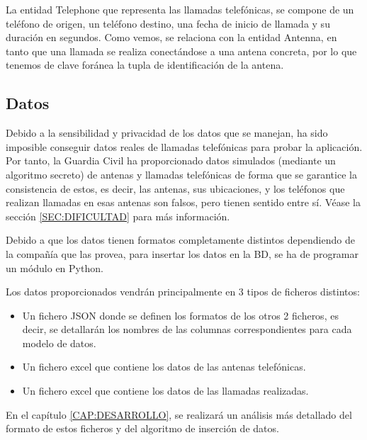     La entidad Telephone que representa las llamadas telefónicas, se compone de un teléfono de origen, un teléfono destino, una fecha de inicio de llamada y su duración en segundos. Como vemos, se relaciona con la entidad Antenna, en tanto que una llamada se realiza conectándose a una antena concreta, por lo que tenemos de clave foránea la tupla de identificación de la antena.
       
       
  \subsection{Datos}
    Debido a la sensibilidad y privacidad de los datos que se manejan, ha sido imposible conseguir datos reales de llamadas telefónicas para probar la aplicación. Por tanto, la Guardia Civil ha proporcionado datos simulados (mediante un algoritmo secreto) de antenas y llamadas telefónicas de forma que se garantice la consistencia de estos, es decir, las antenas, sus ubicaciones, y los teléfonos que realizan llamadas en esas antenas son falsos, pero tienen sentido entre sí. Véase la sección \ref{SEC:DIFICULTAD} para más información.

    Debido a que los datos tienen formatos completamente distintos dependiendo de la compañía que las provea, para insertar los datos en la BD, se ha de programar un módulo en Python.
    
    Los datos proporcionados vendrán principalmente en 3 tipos de ficheros distintos:
    \begin{itemize}
      \item Un fichero JSON donde se definen los formatos de los otros 2 ficheros, es decir, se detallarán los nombres de las columnas correspondientes para cada modelo de datos.
      \item Un fichero excel que contiene los datos de las antenas telefónicas.
      \item Un fichero excel que contiene los datos de las llamadas realizadas.
    \end{itemize}
  
    En el capítulo \ref{CAP:DESARROLLO}, se realizará un análisis más detallado del formato de estos ficheros y del algoritmo de inserción de datos.